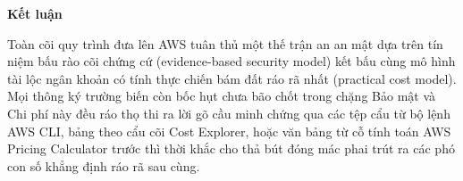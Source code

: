 \vspace{0.5em}\noindent\textbf{Kết luận}\par

Toàn cõi quy trình đưa lên AWS tuân thủ một thế trận an an mật dựa trên
tín niệm bấu rào cõi chứng cứ (evidence-based security model) kết bấu
cùng mô hình tài lộc ngân khoản có tính thực chiến bám đất ráo rã nhất
(practical cost model). Mọi thông ký trường biến còn bốc hụt chưa bão
chốt trong chặng Bảo mật và Chi phí này đều ráo thọ thi ra lời gõ cầu
minh chứng qua các tệp cẩu từ bộ lệnh AWS CLI, bảng theo cẩu cõi Cost
Explorer, hoặc văn bảng từ cỗ tính toán AWS Pricing Calculator trước thì
thời khắc cho thả bút đóng mác phai trút ra các phó con số khẳng định
ráo rã sau cùng.
